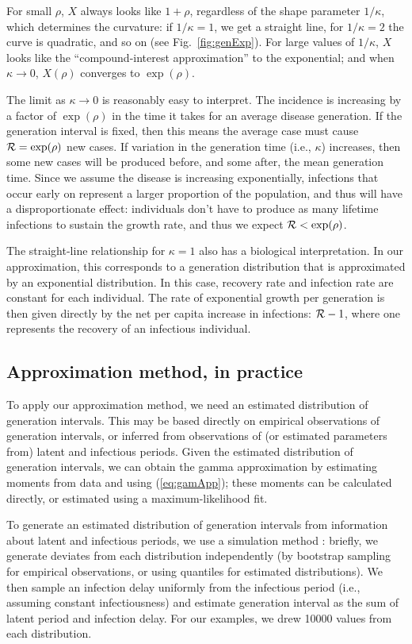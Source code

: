 \documentclass[12pt,]{article}
\newcommand{\RR}{\ensuremath{{\cal R}}}
\newcommand{\eref}[1]{(\ref{eq:#1})}
\newcommand{\fref}[1]{Fig.~\ref{fig:#1}}
\begin{document}
For small $\rho$, $X$ always looks like $1+\rho$, regardless of the shape parameter $1/\kappa$, which determines the curvature: if $1/\kappa = 1$, we get a straight line, for $1/\kappa=2$ the curve is quadratic, and so on (see \fref{genExp}).
For large values of $1/\kappa$, $X$ looks like the ``compound-interest approximation'' to the exponential; and when $\kappa \to 0$, $X(\rho)$ converges to $\exp(\rho)$.

The limit as $\kappa\to 0$ is reasonably easy to interpret. The incidence is increasing by a factor of $\exp(\rho)$ in the time it takes for an average disease generation. If the generation interval is fixed, then this means the average case must cause $\RR = \exp(\rho)$ new cases.
If variation in the generation time (i.e., $\kappa$) increases, then some new cases will be produced before, and some after, the mean generation time.
Since we assume the disease is increasing exponentially, infections that occur early on represent a larger proportion of the population, and thus will have a disproportionate effect: individuals don't have to produce as many lifetime infections to sustain the growth rate, and thus we expect  $\RR < \exp(\rho)$.

The straight-line relationship for $\kappa=1$ also has a biological interpretation. 
In our approximation, this corresponds to a generation distribution that is approximated by an exponential distribution. 
In this case, recovery rate and infection rate are constant for each individual.
The rate of exponential growth per generation is then given directly by the net per capita increase in infections: $\RR-1$, where one represents the recovery of an infectious individual.

\subsection{Approximation method, in practice}

To apply our approximation method, we need an estimated distribution of generation intervals. 
This may be based directly on empirical observations of generation intervals, or inferred from observations of (or estimated parameters from) latent and infectious periods. 
Given the estimated distribution of generation intervals, we can obtain the gamma approximation by estimating moments from data and using \eref{gamApp}; these moments can be calculated directly, or estimated using a maximum-likelihood fit.

To generate an estimated distribution of generation intervals from information about latent and infectious periods, we use a simulation method \cite{HampDush09}: briefly, we generate deviates from each distribution independently (by bootstrap sampling for empirical observations, or using quantiles for estimated distributions). 
We then sample an infection delay uniformly from the infectious period (i.e., assuming constant infectiousness) and estimate generation interval as the sum of latent period and infection delay.  
For our examples, we drew 10000 values from each distribution. 
\end{document}
